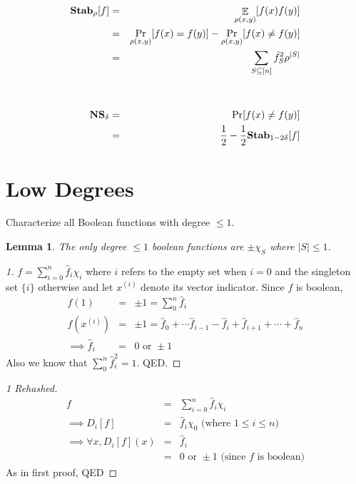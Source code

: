 \documentclass{sig-alternate}
\newtheorem{lemma}[theorem]{Lemma}
\newenvironment{problem}[1][Problem]{\begin{trivlist}
\item[\hskip \labelsep {\bfseries #1}]}{\end{trivlist}}
\begin{document}
\begin{eqnarray*}
{\bf Stab}_{\rho}[f]  & =  & \mathop{\mathbb{E}}_{\rho(x,y)}[f(x)f(y)] \\
& = & \Pr_{\rho(x,y)}[f(x) = f(y)] - \Pr_{\rho(x,y)}[f(x) \neq f(y)] \\
& = & \sum_{S\subseteq [n]}\hat{f}^2_S\rho^{|S|} \\
& & \\
& & \\
{\bf NS}_{\delta} & = & \Pr[f(x) \neq f(y)] \\
& = & \frac{1}{2} - \frac{1}{2}{\bf Stab}_{1 - 2\delta}[f]
\end{eqnarray*}


\newpage*
\newpage
\section{Low Degrees}
\begin{problem}
Characterize all Boolean functions with degree $\leq 1$.
\end{problem}

\begin{lemma}
The only degree $\leq 1$ boolean functions are $\pm \chi_S$ where $|S| \leq 1$. 
\end{lemma}

\begin{proof}[1]
$f = \sum_{i=0}^{n} \hat{f}_i\chi_i$ where $i$ refers to the empty set when $i=0$ and the singleton set $\{i\}$ otherwise and let $x^{(i)}$ denote its vector indicator. Since $f$ is boolean,
\begin{eqnarray*} 
f(1) & = & \pm 1 = \sum_{0}^{n} \hat{f}_i \\
f(x^{(i)}) & = & \pm 1 = \hat{f}_0 + \cdots \hat{f}_{i-1} - \hat{f}_i + \hat{f}_{i+1} + \cdots + \hat{f}_n \\
\implies \hat{f}_i & = & 0 \mbox{ or } \pm 1
\end{eqnarray*}
Also we know that $\sum_{0}^{n} \hat{f}_i^2 = 1$. QED.
\end{proof}

\begin{proof}[1 Rehashed]
\begin{eqnarray*}
f & = & \sum_{i=0}^{n} \hat{f}_i\chi_i \\
\implies D_i[f] & = & \hat{f}_i\chi_0 \mbox{   (where } 1\leq i \leq n \mbox{)} \\
\implies \forall x, D_i[f](x) & = & \hat{f}_i \\
	& = & 0 \mbox{ or } \pm 1 \mbox{ (since $f$ is boolean)}
\end{eqnarray*}
As in first proof, QED
\end{proof}
 
\end{document}
